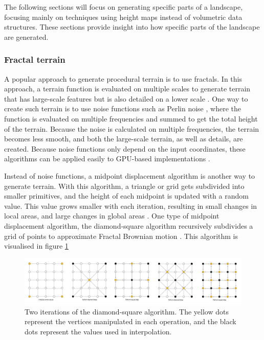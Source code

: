 \documentclass{article}
\begin{document}
The following sections will focus on generating specific parts of a landscape, focusing mainly on techniques using height maps instead of volumetric data structures. These sections provide insight into how specific parts of the landscape are generated.

\subsubsection{Fractal terrain} 
A popular approach to generate procedural terrain is to use fractals. In this approach, a terrain function is evaluated on multiple scales to generate terrain that has large-scale features but is also detailed on a lower scale \cite{shaker_procedural_2016}. One way to create such terrain is to use noise functions such as Perlin noise \cite{musgrave_synthesis_1989}, where the function is evaluated on multiple frequencies and summed to get the total height of the terrain. Because the noise is calculated on multiple frequencies, the terrain becomes less smooth, and both the large-scale terrain, as well as details, are created. 
Because noise functions only depend on the input coordinates, these algorithms can be applied easily to GPU-based implementations \cite{schneider_real-time_2006}. 

Instead of noise functions, a midpoint displacement algorithm is another way to generate terrain. With this algorithm, a triangle or grid gets subdivided into smaller primitives, and the height of each midpoint is updated with a random value. This value grows smaller with each iteration, resulting in small changes in local areas, and large changes in global areas \cite{sala_mathematics_2002}. One type of midpoint displacement algorithm, the diamond-square algorithm recursively subdivides a grid of points to approximate Fractal Brownian motion \cite{miller_definition_1986}. This algorithm is visualised in figure \ref{fig:diamond_square}

\begin{figure}
    \centering
    \includegraphics[width=\textwidth]{figures/Diamond_Square}
    \caption{Two iterations of the diamond-square algorithm. The yellow dots represent the vertices manipulated in each operation, and the black dots represent the values used in interpolation\protect\footnotemark.}
    \label{fig:diamond_square}
\end{figure}
\end{document}
